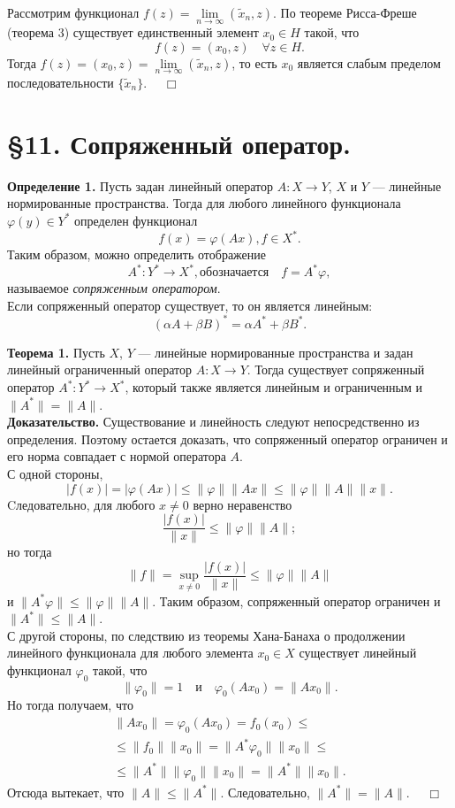 \documentclass[12pt,a4paper, titlepage]{article}
\begin{document}
Рассмотрим функционал $f(z) = \lim\limits_{n\to\infty} (\tilde x_n, z)$. По теореме Рисса-Фреше (теорема 3) существует единственный элемент $x_0 \in H$ такой, что
$$
f(z) = (x_0, z) \quad \forall z \in H.
$$
Тогда $f(z) = (x_0, z) = \lim\limits_{n\to\infty} (\tilde x_n, z)$, то есть $x_0$ является слабым пределом последовательности $\{\tilde x_n\}$. $\quad \Box$\\



\section*{ \S 11. Сопряженный оператор.}

\textbf{Определение 1.} Пусть задан линейный оператор $A: X \to Y$, $X$ и $Y$ --- линейные нормированные пространства. Тогда для любого линейного функционала $\varphi (y) \in Y^*$ определен функционал
$$
f(x) = \varphi (Ax), f \in X^*.
$$
Таким образом, можно определить отображение
$$
A^*: Y^* \to X^*, \text{обозначается}\quad f = A^* \varphi,
$$
называемое \textit{сопряженным оператором}.\\

Если сопряженный оператор существует, то он является линейным:
$$
(\alpha A + \beta B)^* = \alpha A^* + \beta B^*.
$$

\textbf{Теорема 1.} Пусть $X$, $Y$ --- линейные нормированные пространства и задан линейный ограниченный оператор $A: X \to Y$. Тогда существует сопряженный оператор $A^*: Y^* \to X^*$, который также является линейным и ограниченным и $\|A^*\| = \|A\|$.\\
\textbf{Доказательство.} Существование и линейность следуют непосредственно из определения. Поэтому остается доказать, что сопряженный оператор ограничен и его норма совпадает с нормой оператора $A$.\\

С одной стороны,
$$
|f(x)| = |\varphi (Ax)| \leqslant \|\varphi\| \|Ax\| \leqslant \|\varphi\| \|A\| \|x\|.
$$
Cледовательно, для любого $x \neq 0$ верно неравенство 
$$
\frac{|f(x)|}{\|x\|} \leqslant \|\varphi\|\|A\|;
$$
но тогда
$$
\|f\| = \sup_{x \neq 0} \frac{|f(x)|}{\|x\|} \leqslant \|\varphi\|\|A\|
$$
и $\|A^*\varphi\| \leqslant \|\varphi\|\|A\|$. Таким образом, сопряженный оператор ограничен и $\|A^*\| \leqslant \|A\|$.\\

С другой стороны, по следствию из теоремы Хана-Банаха о продолжении линейного функционала для любого элемента $x_0 \in X$ существует линейный функционал ${\varphi}_0$ такой, что
$$
\|{\varphi}_0\| = 1 \quad \text{и} \quad {\varphi}_0 (A x_0) = \|A x_0\|. 
$$
Но тогда получаем, что
\begin{multline*}
\|Ax_0\| = \varphi_0 (Ax_0) = f_0(x_0) \leqslant \\
\leqslant \|f_0\| \|x_0\| = \|A^*{\varphi}_0\|\|x_0\| \leqslant \\
\leqslant \|A^*\| \|\varphi_0\| \|x_0\| = \|A^*\| \|x_0\|.
\end{multline*}
Отсюда вытекает, что $\|A\| \leqslant \|A^*\|$. Следовательно, $\|A^*\| = \|A\|$. $\quad \Box$\\
\end{document}
